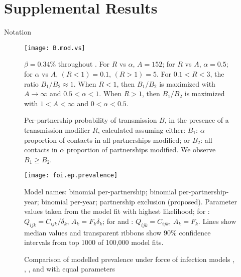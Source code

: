 \section{Supplemental Results}\label{sup}
\begin{table}[h]
  \caption{Notation}
  \label{tab:notation}
  \centering
  
\end{table}
\begin{figure}[h]
  \centerline{\texttt{[image: B.mod.vs]}}
  \caption{Per-partnership probability of transmission $B$,
    in the presence of a transmission modifier $R$, calculated assuming either:
    $B_1$: $\alpha$ proportion of contacts in all partnerships modified; or
    $B_2$: all contacts in $\alpha$ proportion of partnerships modified.
    We observe $B_1 \ge B_2$.}
  \label{fig:B.mod.sens}
  \floatfoot
  $\beta = 0.34\%$ throughout \cite{Boily2009}.
  For $R$ vs $\alpha$, $A = 152$;
  for $R$ vs $A$, $\alpha = 0.5$;
  for $\alpha$ vs $A$, $(R<1) = 0.1$, $(R>1) = 5$.
  For $0.1 < R < 3$, the ratio $B_1 / B_2 \approx 1$.
  When $R < 1$, then $B_1 / B_2$ is maximized with $A \rightarrow \infty$ and $0.5 < \alpha < 1$.
  When $R > 1$, then $B_1 / B_2$ is maximized with $1 < A < \infty$ and $0 < \alpha < 0.5$.
\end{figure}
\begin{figure}[h]
  \centerline{\texttt{[image: foi.ep.prevalence]}}
  \caption{Comparison of modelled prevalence under force of infection models
    , , , and  with equal parameters}
  \label{fig:ep.prev}
  \floatfoot
  Model names:
   binomial per-partnership;
   binomial per-partnership-year;
   binomial per-year;
   partnership exclusion (proposed).
  Parameter values taken from the  model fit with highest likelihood;
  for : $Q_{ijk} = C_{ijk} / \delta_k$, $A_{k} = F_{k} \delta_k$;
  for  and : $Q_{ijk} = C_{ijk}$, $A_{k} = F_{k}$.
  Lines show median values and transparent ribbons show 90\% confidence intervals
  from top 1000 of 100,000  model fits.
\end{figure}
